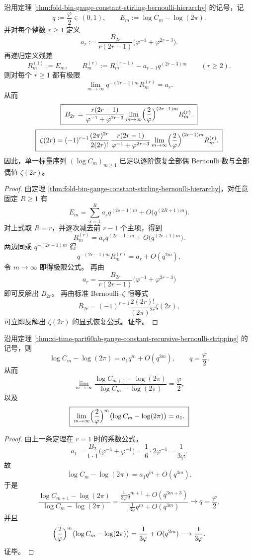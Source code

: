 \begin{theorem}\label{thm:xi-time-part60ab-gauge-constant-recursive-bernoulli-stripping}
沿用定理 \ref{thm:fold-bin-gauge-constant-stirling-bernoulli-hierarchy} 的记号，记
\[
q:=\frac{\varphi}{2}\in(0,1),
\qquad
E_m:=\log C_m-\log(2\pi).
\]
并对每个整数 \(r\ge 1\) 定义
\[
a_r:=
\frac{B_{2r}}{r(2r-1)}
\bigl(\varphi^{-1}+\varphi^{2r-3}\bigr).
\]
再递归定义残差
\[
R_m^{(1)}:=E_m,
\qquad
R_m^{(r)}:=R_m^{(r-1)}-a_{r-1}q^{(2r-3)m}
\qquad (r\ge 2).
\]
则对每个 \(r\ge 1\) 都有极限
\[
\boxed{\;
\lim_{m\to\infty}q^{-(2r-1)m}R_m^{(r)}=a_r.\;}
\]
从而
\[
\boxed{\;
B_{2r}
=
\frac{r(2r-1)}{\varphi^{-1}+\varphi^{2r-3}}
\lim_{m\to\infty}
\Bigl(\frac{2}{\varphi}\Bigr)^{(2r-1)m}R_m^{(r)}.\;}
\]
\[
\boxed{\;
\zeta(2r)
=
(-1)^{r-1}\frac{(2\pi)^{2r}}{2(2r)!}\,
\frac{r(2r-1)}{\varphi^{-1}+\varphi^{2r-3}}
\lim_{m\to\infty}
\Bigl(\frac{2}{\varphi}\Bigr)^{(2r-1)m}R_m^{(r)}.\;}
\]
因此，单一标量序列 \((\log C_m)_{m\ge 1}\) 已足以逐阶恢复全部偶 Bernoulli 数与全部偶值 \(\zeta(2r)\)。
\end{theorem}
\begin{proof}
由定理 \ref{thm:fold-bin-gauge-constant-stirling-bernoulli-hierarchy}，对任意固定 \(R\ge 1\) 有
\[
E_m
=
\sum_{s=1}^{R}a_s q^{(2s-1)m}
+O\!\bigl(q^{(2R+1)m}\bigr).
\]
对上式取 \(R=r\)，并逐次减去前 \(r-1\) 个主项，得到
\[
R_m^{(r)}
=
a_r q^{(2r-1)m}+O\!\bigl(q^{(2r+1)m}\bigr).
\]
两边同乘 \(q^{-(2r-1)m}\) 得
\[
q^{-(2r-1)m}
R_m^{(r)}
=
a_r+O(q^{2m}),
\]
令 \(m\to\infty\) 即得极限公式。
再由
\[
a_r=
\frac{B_{2r}}{r(2r-1)}
\bigl(\varphi^{-1}+\varphi^{2r-3}\bigr)
\]
即可反解出 \(B_{2r}\)。
再由标准 Bernoulli--\(\zeta\) 恒等式
\[
B_{2r}
=
(-1)^{r-1}\frac{2(2r)!}{(2\pi)^{2r}}\zeta(2r),
\]
可立即反解出 \(\zeta(2r)\) 的显式恢复公式。证毕。
\end{proof}

\begin{corollary}\label{cor:xi-time-part60ab-gauge-constant-leading-mode-ratio}
沿用定理 \ref{thm:xi-time-part60ab-gauge-constant-recursive-bernoulli-stripping} 的记号，则
\[
\boxed{\;
\log C_m-\log(2\pi)
=
a_1 q^m+O(q^{3m}),
\qquad
q=\frac{\varphi}{2}.\;}
\]
从而
\[
\boxed{\;
\lim_{m\to\infty}
\frac{\log C_{m+1}-\log(2\pi)}
{\log C_m-\log(2\pi)}
=
\frac{\varphi}{2},\;}
\]
以及
\[
\boxed{\;
\lim_{m\to\infty}
\Bigl(\frac{2}{\varphi}\Bigr)^m
\bigl(\log C_m-\log(2\pi)\bigr)
=
a_1.\;}
\]
\end{corollary}
\begin{proof}
由上一条定理在 \(r=1\) 时的系数公式，
\[
a_1=
\frac{B_2}{1\cdot 1}
\bigl(\varphi^{-1}+\varphi^{-1}\bigr)
=
\frac16\cdot 2\varphi^{-1}
=
\frac{1}{3\varphi}.
\]
故
\[
\log C_m-\log(2\pi)
=
a_1 q^m+O(q^{3m}).
\]
于是
\[
\frac{\log C_{m+1}-\log(2\pi)}
{\log C_m-\log(2\pi)}
=
\frac{\frac{1}{3\varphi}q^{m+1}+O(q^{3m+3})}
{\frac{1}{3\varphi}q^m+O(q^{3m})}
\longrightarrow q=\frac{\varphi}{2},
\]
并且
\[
\Bigl(\frac{2}{\varphi}\Bigr)^m\bigl(\log C_m-\log(2\pi)\bigr)
=
\frac{1}{3\varphi}+O(q^{2m})
\longrightarrow
\frac{1}{3\varphi}.
\]
证毕。
\end{proof}

